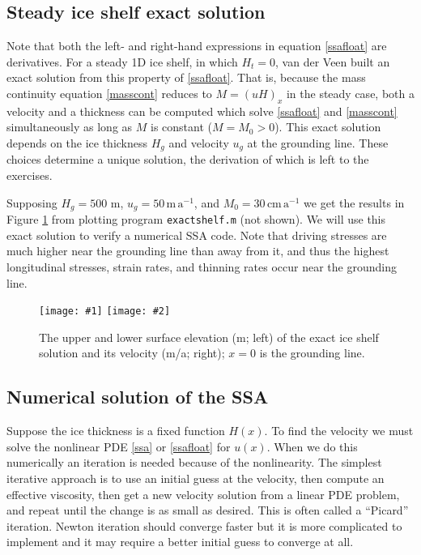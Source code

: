 \documentclass[letterpaper,final,12pt,reqno]{amsart}
\newcommand{\twofigsizes}[5]{
\begin{figure}[ht]
\centering
\texttt{[image: \#1]} \quad
\texttt{[image: \#2]}
\caption{#3}
\label{fig:#1}
\end{figure}}
\newcommand{\twofig}[3]{\twofigsizes{#1}{#2}{#3}{2.5in}{2.5in}}
\begin{document}
\subsection*{Steady ice shelf exact solution}  Note that both the left- and right-hand expressions in equation \eqref{ssafloat} are derivatives.  For a steady 1D ice shelf, in which $H_t=0$, van der Veen \cite{vanderVeen83} built an exact solution from this property of \eqref{ssafloat}.  That is, because the mass continuity equation \eqref{masscont} reduces to $M=(uH)_x$ in the steady case, both a velocity and a thickness can be computed \cite{vanderVeen83} which solve \eqref{ssafloat} and \eqref{masscont} simultaneously as long as $M$ is constant ($M=M_0>0$).  This exact solution depends on the ice thickness $H_g$ and velocity $u_g$ at the grounding line.  These choices determine a unique solution, the derivation of which is left to the exercises.

Supposing $H_g=500$ m, $u_g = 50 \,\text{m}\,\text{a}^{-1}$, and $M_0=30 \,\text{cm}\,\text{a}^{-1}$ we get the results in Figure \ref{fig:steadyshelfprofile} from plotting program \texttt{exactshelf.m} (not shown).  We will use this exact solution to verify a numerical SSA code.  Note that driving stresses are much higher near the grounding line than away from it, and thus the highest longitudinal stresses, strain rates, and thinning rates occur near the grounding line.

\twofig{steadyshelfprofile}{steadyshelfvelocity}{The upper and lower surface elevation (m; left) of the exact ice shelf solution and its velocity (m/a; right); $x=0$ is the grounding line.}

\subsection*{Numerical solution of the SSA}  Suppose the ice thickness is a fixed function $H(x)$.  To find the velocity we must solve the nonlinear PDE \eqref{ssa} or \eqref{ssafloat} for $u(x)$.  When we do this numerically an iteration is needed because of the nonlinearity.  The simplest iterative approach is to use an initial guess at the velocity, then compute an effective viscosity, then get a new velocity solution from a linear PDE problem, and repeat until the change is as small as desired.  This is often called a ``Picard'' iteration.  Newton iteration should converge faster but it is more complicated to implement and it may require a better initial guess to converge at all.
\end{document}
